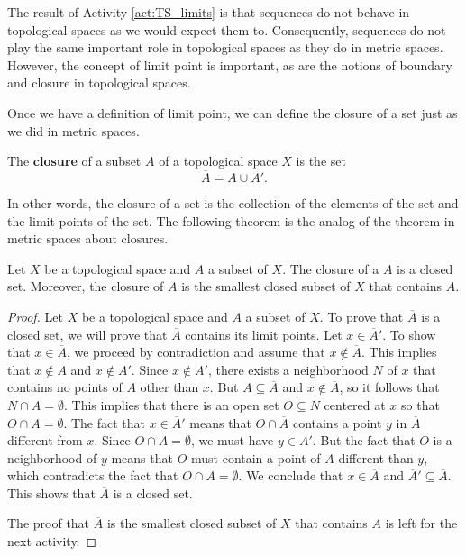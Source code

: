 The result of Activity \ref{act:TS_limits} is that sequences do not behave in topological spaces as we would expect them to. Consequently, sequences do not play the same important role in topological spaces as they do in metric spaces. However, the concept of limit point is important, as are the notions of boundary and closure in topological spaces. 

\label{sec_top_closure}

Once we have a definition of limit point, we can define the closure of a set just as we did in metric spaces. 

\begin{definition} The \textbf{closure} of a subset $A$ of a topological space $X$ is the set 
\[\overline{A} = A \cup A'.\]
\end{definition}

In other words, the closure of a set is the collection of the elements of the set and the limit points of the set. The following theorem is the analog of the theorem in metric spaces about closures. 

\begin{theorem} \label{thm:TS_closure_closed} Let $X$ be a topological space and $A$ a subset of $X$. The closure of a $A$ is a closed set. Moreover, the closure of $A$ is the smallest closed subset of $X$ that contains $A$. 
\end{theorem}

\begin{proof} Let $X$ be a topological space and $A$ a subset of $X$. To prove that $\overline{A}$ is a closed set, we will prove that $\overline{A}$ contains its limit points. Let $x \in \overline{A}'$. To show that $x \in \overline{A}$, we proceed by contradiction and assume that $x \notin \overline{A}$. This implies that $x \notin A$ and $x \notin A'$. Since $x \notin A'$, there exists a neighborhood $N$ of $x$ that contains no points of $A$ other than $x$. But $A \subseteq \overline{A}$ and $x \notin \overline{A}$, so it follows that $N \cap A = \emptyset$. This implies that there is an open set $O \subseteq N$ centered at $x$ so that $O \cap A = \emptyset$. The fact that $x \in \overline{A}'$ means that $O \cap \overline{A}$ contains a point $y$ in $\overline{A}$ different from $x$. Since $O \cap A = \emptyset$, we must have $y \in A'$. But the fact that $O$ is a neighborhood of $y$ means that $O$ must contain a point of $A$ different than $y$, which contradicts the fact that $O \cap A = \emptyset$. We conclude that $x \in \overline{A}$ and $\overline{A}' \subseteq \overline{A}$. This shows that $\overline{A}$ is a closed set. 

The proof that $\overline{A}$ is the smallest closed subset of $X$ that contains $A$ is left for the next activity.
\end{proof}

